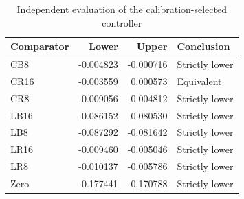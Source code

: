 \begin{table}[htbp]\centering
\caption{Independent evaluation of the calibration-selected controller}\label{tab:selected86}
{\small\setlength{\tabcolsep}{4pt}\begin{tabular}{lrrl}\hline
Comparator & Lower & Upper & Conclusion \\
\hline
CB8 & -0.004823 & -0.000716 & Strictly lower \\
CR16 & -0.003559 & 0.000573 & Equivalent \\
CR8 & -0.009056 & -0.004812 & Strictly lower \\
LB16 & -0.086152 & -0.080530 & Strictly lower \\
LB8 & -0.087292 & -0.081642 & Strictly lower \\
LR16 & -0.009460 & -0.005046 & Strictly lower \\
LR8 & -0.010137 & -0.005786 & Strictly lower \\
Zero & -0.177441 & -0.170788 & Strictly lower \\
\hline\end{tabular}}
\par{}\end{table}
